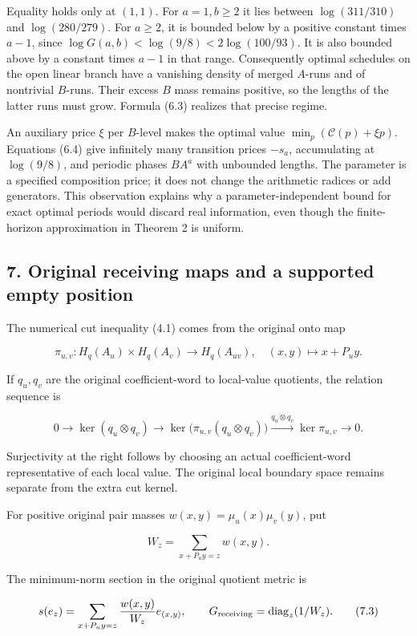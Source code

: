 Equality holds only at \((1,1)\). For \(a=1,b\ge2\) it lies between \(\log(311/310)\) and \(\log(280/279)\). For \(a\ge2\), it is bounded below by a positive constant times \(a-1\), since \(\log G(a,b)<\log(9/8)<2\log(100/93)\). It is also bounded above by a constant times \(a-1\) in that range. Consequently optimal schedules on the open linear branch have a vanishing density of merged \(A\)-runs and of nontrivial \(B\)-runs. Their excess \(B\) mass remains positive, so the lengths of the latter runs must grow. Formula (6.3) realizes that precise regime.

An auxiliary price \(\xi\) per \(B\)-level makes the optimal value \(\min_p(\mathcal C(p)+\xi p)\). Equations (6.4) give infinitely many transition prices \(-s_a\), accumulating at \(\log(9/8)\), and periodic phases \(BA^a\) with unbounded lengths. The parameter is a specified composition price; it does not change the arithmetic radices or add generators. This observation explains why a parameter-independent bound for exact optimal periods would discard real information, even though the finite-horizon approximation in Theorem 2 is uniform.

\subsection{7. Original receiving maps and a supported empty position}\label{eporig:original-receiving-maps-and-a-supported-empty-position}

The numerical cut inequality (4.1) comes from the original onto map

\[
\pi_{u,v}:H_q(A_u)\times H_q(A_v)\to H_q(A_{uv}),
\quad(x,y)\mapsto x+P_uy.
\tag{7.1}
\]

If \(q_u,q_v\) are the original coefficient-word to local-value quotients, the relation sequence is

\[
0\to\ker(q_u\otimes q_v)
\to\ker\bigl(\pi_{u,v}(q_u\otimes q_v)\bigr)
\xrightarrow{q_u\otimes q_v}\ker\pi_{u,v}\to0.
\tag{7.2}
\]

Surjectivity at the right follows by choosing an actual coefficient-word representative of each local value. The original local boundary space remains separate from the extra cut kernel.

For positive original pair masses \(w(x,y)=\mu_u(x)\mu_v(y)\), put

\[
W_z=\sum_{x+P_uy=z}w(x,y).
\]

The minimum-norm section in the original quotient metric is

\[
s(e_z)=\sum_{x+P_uy=z}\frac{w(x,y)}{W_z}e_{(x,y)},
\qquad G_{\rm receiving}=\operatorname{diag}_z(1/W_z).
\tag{7.3}
\]

